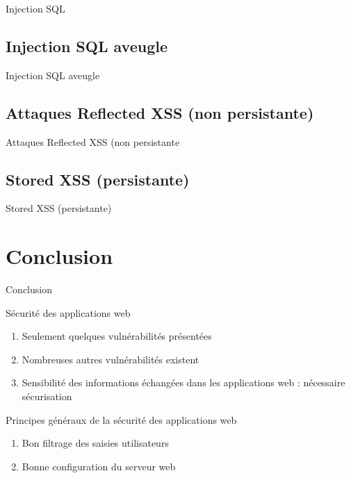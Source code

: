 \documentclass[8pt]{beamer}
\begin{document}
\begin{frame}{Injection SQL}

\end{frame}

\subsection{Injection SQL aveugle}

\begin{frame}{Injection SQL aveugle}

\end{frame}

\subsection{Attaques Reflected XSS (non persistante)}

\begin{frame}{Attaques Reflected XSS (non persistante}

\end{frame}

\subsection{Stored XSS (persistante)}

\begin{frame}{Stored XSS (persistante)}

\end{frame}

\section{Conclusion}

\begin{frame}
  \tableofcontents[sectionstyle=show/shaded,subsectionstyle=shaded]
\end{frame}

\begin{frame}{Conclusion}

\begin{block}{Sécurité des applications web}
	\begin{enumerate}[\ding{217}]
		\item Seulement quelques vulnérabilités présentées
		\item Nombreuses autres vulnérabilités existent
		\item Sensibilité des informations échangées dans les applications web : nécessaire sécurisation
	\end{enumerate}
\end{block}

\begin{block}{Principes généraux de la sécurité des applications web}
	\begin{enumerate}[\ding{217}]
		\item Bon filtrage des saisies utilisateurs
		\item Bonne configuration du serveur web
	\end{enumerate}
\end{block}

\end{frame}
	
	
\end{document}

